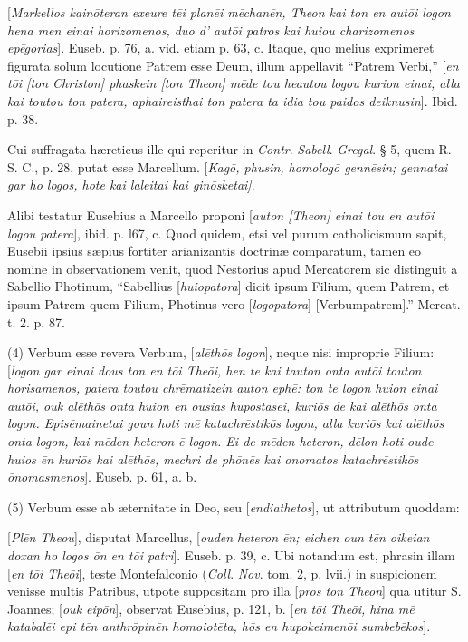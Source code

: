 [\emph{Markellos
kain\={o}teran exeure t\={e}i plan\={e}i m\={e}chan\={e}n,
Theon kai ton en aut\={o}i logon hena men einai horizomenos, duo d'
aut\={o}i patros kai huiou charizomenos ep\={e}gorias}].
Euseb. p. 76, a. vid. etiam p. 63, c. Itaque, quo melius exprimeret
figurata solum locutione Patrem esse Deum, illum appellavit ``Patrem
Verbi,'' [\emph{en t\={o}i [ton Christon] phaskein [ton Theon] m\={e}de
tou heautou logou kurion einai, alla kai toutou ton patera,
aphaireisthai ton patera ta idia tou paidos deiknusin}]. Ibid. p.
38.

Cui
suffragata hæreticus ille qui reperitur in \emph{Contr}. \emph{Sabell}.
\emph{Gregal}. § 5, quem R. S. C., p. 28, putat esse Marcellum. [\emph{Kag\={o},
phusin, homolog\={o} genn\={e}sin; gennatai gar ho logos, hote
kai laleitai kai gin\={o}sketai]}.

Alibi
testatur Eusebius a Marcello proponi [\emph{auton [Theon] einai tou en
aut\={o}i logou patera}], ibid. p. l67, c. Quod quidem, etsi vel
purum catholicismum sapit, Eusebii ipsius sæpius fortiter
arianizantis doctrinæ comparatum, tamen eo nomine in observationem
venit, quod Nestorius apud Mercatorem sic distinguit a Sabellio
Photinum, ``Sabellius [\emph{huiopatora}] dicit ipsum Filium, quem
Patrem, et ipsum Patrem quem Filium, Photinus vero [\emph{logopatora}]
[Verbumpatrem].'' Mercat. t. 2. p. 87.

(4)
Verbum esse revera Verbum, [\emph{al\={e}th\={o}s logon}], neque
nisi improprie Filium: [\emph{logon gar einai dous ton en t\={o}i The\={o}i,
hen te kai tauton onta aut\={o}i touton horisamenos, patera toutou
chr\={e}matizein auton eph\={e}: ton te logon huion einai aut\={o}i,
ouk al\={e}th\={o}s onta huion en ousias hupostasei, kuri\={o}s
de kai al\={e}th\={o}s onta logon. Epis\={e}mainetai goun
hoti m\={e} katachr\={e}stik\={o}s logon, alla kuri\={o}s
kai al\={e}th\={o}s onta logon, kai m\={e}den heteron \={e}
logon. Ei de m\={e}den heteron, d\={e}lon hoti oude huios \={e}n
kuri\={o}s kai al\={e}th\={o}s, mechri de ph\={o}n\={e}s
kai onomatos katachr\={e}stik\={o}s \={o}nomasmenos}].
Euseb. p. 61, a. b.

(5)
Verbum esse ab æternitate in Deo, seu [\emph{endiathetos}], ut
attributum quoddam:

[\emph{Pl\={e}n
Theou}], disputat Marcellus, [\emph{ouden heteron \={e}n; eichen
oun t\={e}n oikeian doxan ho logos \={o}n en t\={o}i patri}].
Euseb. p. 39, c. Ubi notandum est, phrasin illam [\emph{en t\={o}i The\={o}i}],
teste Montefalconio (\emph{Coll}. \emph{Nov}. tom. 2, p. lvii.) in
suspicionem venisse multis Patribus, utpote suppositam pro illa [\emph{pros
ton Theon}] qua utitur S. Joannes; [\emph{ouk eip\={o}n}],
observat Eusebius, p. 121, b. [\emph{en t\={o}i The\={o}i, hina m\={e}
katabal\={e}i epi t\={e}n anthr\={o}pin\={e}n homoiot\={e}ta,
h\={o}s en hupokeimen\={o}i sumbeb\={e}kos}].

